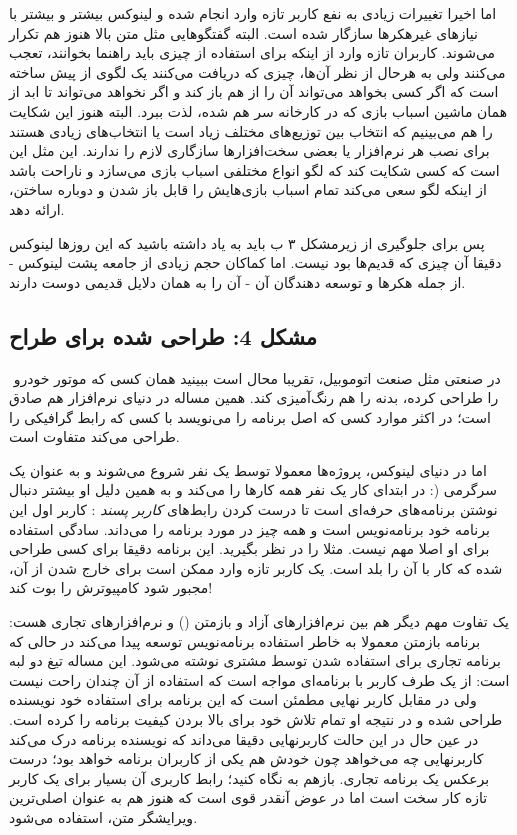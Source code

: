 اما اخیرا تغییرات زیادی به نفع کاربر تازه وارد انجام شده و لینوکس بیشتر و بیشتر با نیازهای غیرهکرها سازگار شده است. البته گفتگوهایی مثل متن بالا هنوز هم تکرار می‌شوند. کاربران تازه وارد از اینکه برای استفاده از چیزی باید راهنما بخوانند، تعجب می‌کنند ولی به هرحال از نظر آن‌ها، چیزی که دریافت می‌کنند یک لگوی از پیش ساخته است که اگر کسی بخواهد می‌تواند آن را از هم باز کند و اگر نخواهد می‌تواند تا ابد از همان ماشین اسباب بازی که در کارخانه سر هم شده، لذت ببرد. البته هنوز این شکایت را هم می‌بینیم که انتخاب بین توزیع‌های مختلف زیاد است یا انتخاب‌های زیادی هستند برای نصب هر نرم‌افزار یا بعضی سخت‌افزارها سازگاری لازم را ندارند. این مثل این است که کسی شکایت کند که لگو انواع مختلفی اسباب بازی می‌سازد و ناراحت باشد از اینکه لگو سعی می‌کند تمام اسباب بازی‌هایش را قابل باز شدن و دوباره ساختن، ارائه دهد.

پس برای جلوگیری از زیرمشکل ۳ ب باید به یاد داشته باشید که این روزها لینوکس دقیقا آن چیزی که قدیم‌ها بود نیست. اما کماکان حجم زیادی از جامعه پشت لینوکس - از جمله هکرها و توسعه دهندگان آن - آن را به همان دلایل قدیمی دوست دارند.

\subsection*{مشکل 4: طراحی شده برای طراح}
‌
در صنعتی مثل صنعت اتوموبیل، تقریبا محال است ببینید همان کسی که موتور خودرو را طراحی کرده، بدنه را هم رنگ‌آمیزی کند. همین مساله در دنیای نرم‌افزار هم صادق است؛ در اکثر موارد کسی که اصل برنامه را می‌نویسد با کسی که رابط گرافیکی را طراحی می‌کند متفاوت است.

اما در دنیای لینوکس، پروژه‌ها معمولا توسط یک نفر شروع می‌شوند و به عنوان یک سرگرمی (: در ابتدای کار یک نفر همه کارها را می‌کند و به همین دلیل او بیشتر دنبال نوشتن برنامه‌های حرفه‌ای است تا درست کردن رابط‌های
\emph{کاربر پسند}
: کاربر اول این برنامه خود برنامه‌نویس است و همه چیز در مورد برنامه را می‌داند. سادگی استفاده برای او اصلا مهم نیست. مثلا 
را در نظر بگیرید. این برنامه دقیقا برای کسی طراحی شده که کار با آن را بلد است. یک کاربر تازه وارد ممکن است برای خارج شدن از آن، مجبور شود کامپیوترش را بوت کند!

یک تفاوت مهم دیگر هم بین نرم‌افزارهای آزاد و بازمتن () و نرم‌افزارهای تجاری هست: برنامه بازمتن معمولا به خاطر استفاده برنامه‌نویس توسعه پیدا می‌کند در حالی که برنامه تجاری برای استفاده شدن توسط مشتری نوشته می‌شود. این مساله تیغ دو لبه است: از یک طرف کاربر با برنامه‌ای مواجه است که استفاده از آن چندان راحت نیست ولی در مقابل کاربر نهایی مطمئن است که این برنامه برای استفاده خود نویسنده طراحی شده و در نتیجه او تمام تلاش خود برای بالا بردن کیفیت برنامه را کرده است. در عین حال در این حالت کاربرنهایی دقیقا می‌داند که نویسنده برنامه درک می‌کند کاربرنهایی چه می‌خواهد چون خودش هم یکی از کاربران برنامه خواهد بود؛ درست برعکس یک برنامه تجاری.
بازهم به 
نگاه کنید؛ رابط کاربری آن بسیار برای یک کاربر تازه کار سخت است اما در عوض آنقدر قوی است که هنوز هم به عنوان اصلی‌ترین ویرایشگر متن، استفاده می‌شود.

